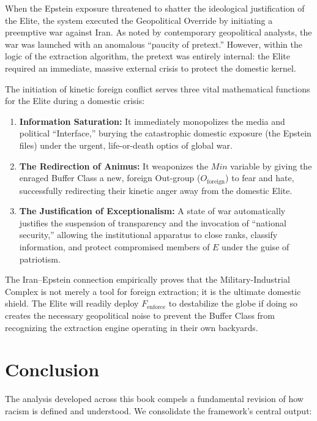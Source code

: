 \documentclass[12pt,openany]{book}
\begin{document}
When the Epstein exposure threatened to shatter the ideological justification of the Elite, the system executed the Geopolitical Override by initiating a preemptive war against Iran. As noted by contemporary geopolitical analysts, the war was launched with an anomalous ``paucity of pretext.'' However, within the logic of the extraction algorithm, the pretext was entirely internal: the Elite required an immediate, massive external crisis to protect the domestic kernel.

The initiation of kinetic foreign conflict serves three vital mathematical functions for the Elite during a domestic crisis:

\begin{enumerate}
    \item \textbf{Information Saturation:} It immediately monopolizes the media and political ``Interface,'' burying the catastrophic domestic exposure (the Epstein files) under the urgent, life-or-death optics of global war.

    \item \textbf{The Redirection of Animus:} It weaponizes the $Min$ variable by giving the enraged Buffer Class a new, foreign Out-group ($O_{\text{foreign}}$) to fear and hate, successfully redirecting their kinetic anger away from the domestic Elite.

    \item \textbf{The Justification of Exceptionalism:} A state of war automatically justifies the suspension of transparency and the invocation of ``national security,'' allowing the institutional apparatus to close ranks, classify information, and protect compromised members of $E$ under the guise of patriotism.
\end{enumerate}

The Iran--Epstein connection empirically proves that the Military-Industrial Complex is not merely a tool for foreign extraction; it is the ultimate domestic shield. The Elite will readily deploy $F_{\text{enforce}}$ to destabilize the globe if doing so creates the necessary geopolitical noise to prevent the Buffer Class from recognizing the extraction engine operating in their own backyards.

\chapter{Conclusion}

The analysis developed across this book compels a fundamental revision of how racism is defined and understood. We consolidate the framework's central output:
\end{document}
